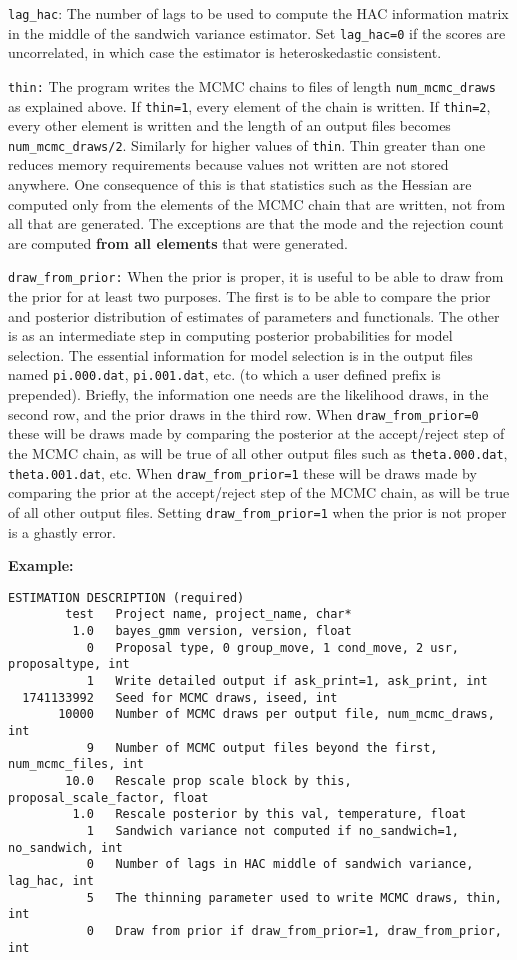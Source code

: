 \documentclass[11pt, letterpaper, notitlepage]{article}
\begin{document}
\texttt{lag\_hac}: The number of lags to be used to compute the HAC information matrix in the middle of the sandwich variance estimator. Set \texttt{lag\_hac=0} if the scores are uncorrelated, in which case the estimator is heteroskedastic consistent.

\texttt{thin:} The program writes the MCMC chains to files of length \texttt{num\_mcmc\_draws} as explained above. If \texttt{thin=1}, every element of the chain is written. If \texttt{thin=2}, every other element is written and the length of an output files becomes \texttt{num\_mcmc\_draws/2}. Similarly for higher values of \texttt{thin}. Thin greater than one reduces memory requirements because values not written are not stored anywhere. One consequence of this is that statistics such as the Hessian are computed only from the elements of the MCMC chain that are written, not from all that are generated. The exceptions are that the mode and the rejection count are computed \textbf{from all elements} that were generated.

\texttt{draw\_from\_prior:} When the prior is proper, it is useful to be able to draw from the prior for at least two purposes. The first is to be able to compare the prior and posterior distribution of estimates of parameters and functionals. The other is as an intermediate step in computing posterior probabilities for model selection. The essential information for model selection is in the output files named \texttt{pi.000.dat}, \texttt{pi.001.dat}, etc. (to which a user defined prefix is prepended). Briefly, the information one needs are the likelihood draws, in the second row, and the prior draws in the third row. When \texttt{draw\_from\_prior=0} these will be draws made by comparing the posterior at the accept/reject step of the MCMC chain, as will be true of all other output files such as \texttt{theta.000.dat}, \texttt{theta.001.dat}, etc. When \texttt{draw\_from\_prior=1} these will be draws made by comparing the prior at the accept/reject step of the MCMC chain, as will be true of all other output files. Setting \texttt{draw\_from\_prior=1} when the prior is not proper is a ghastly error.


\textbf{Example:}

\begin{verbatim}
ESTIMATION DESCRIPTION (required)
        test   Project name, project_name, char*
         1.0   bayes_gmm version, version, float
           0   Proposal type, 0 group_move, 1 cond_move, 2 usr, proposaltype, int
           1   Write detailed output if ask_print=1, ask_print, int
  1741133992   Seed for MCMC draws, iseed, int
       10000   Number of MCMC draws per output file, num_mcmc_draws, int
           9   Number of MCMC output files beyond the first, num_mcmc_files, int
        10.0   Rescale prop scale block by this, proposal_scale_factor, float
         1.0   Rescale posterior by this val, temperature, float
           1   Sandwich variance not computed if no_sandwich=1, no_sandwich, int
           0   Number of lags in HAC middle of sandwich variance, lag_hac, int
           5   The thinning parameter used to write MCMC draws, thin, int
           0   Draw from prior if draw_from_prior=1, draw_from_prior, int
\end{verbatim}
\end{document}
